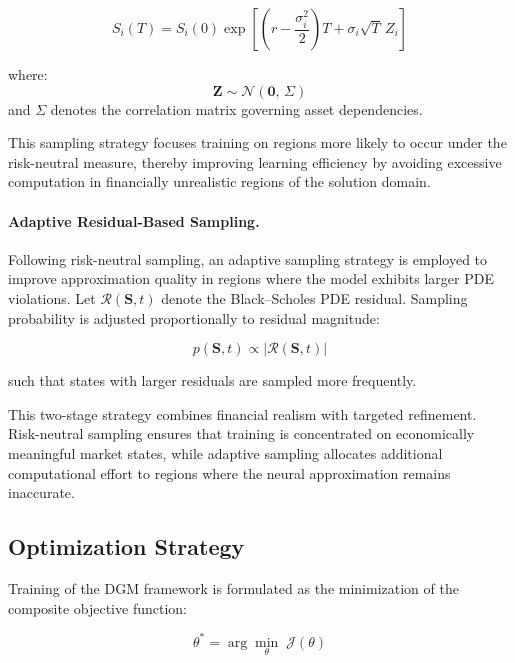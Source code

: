 \documentclass[12pt, a4paper]{article}
\begin{document}
\begin{equation}
    S_i(T) = S_i(0)\exp\!\left[
        \left(r - \frac{\sigma_i^2}{2}\right)T + \sigma_i\sqrt{T}\,Z_i
    \right]
    \label{eq:risk_neutral_sampling}
\end{equation}

where:
\[
    \mathbf{Z} \sim \mathcal{N}(\mathbf{0},\,\Sigma)
\]
and $\Sigma$ denotes the correlation matrix governing asset dependencies.

This sampling strategy focuses training on regions more likely to occur
under the risk-neutral measure, thereby improving learning efficiency by
avoiding excessive computation in financially unrealistic regions of the
solution domain.

\paragraph{Adaptive Residual-Based Sampling.}
Following risk-neutral sampling, an adaptive sampling strategy is
employed to improve approximation quality in regions where the model
exhibits larger PDE violations. Let $\mathcal{R}(\mathbf{S},t)$ denote
the Black--Scholes PDE residual. Sampling probability is adjusted
proportionally to residual magnitude:

\begin{equation}
    p(\mathbf{S},t) \propto |\mathcal{R}(\mathbf{S},t)|
    \label{eq:adaptive_sampling}
\end{equation}

such that states with larger residuals are sampled more frequently.

This two-stage strategy combines financial realism with targeted
refinement. Risk-neutral sampling ensures that training is concentrated
on economically meaningful market states, while adaptive sampling
allocates additional computational effort to regions where the neural
approximation remains inaccurate.

\subsection{Optimization Strategy}

Training of the DGM framework is formulated as the minimization of the
composite objective function:

\begin{equation}
    \theta^* = \arg\min_{\theta}\; \mathcal{J}(\theta)
    \label{eq:optimisation}
\end{equation}
\end{document}
